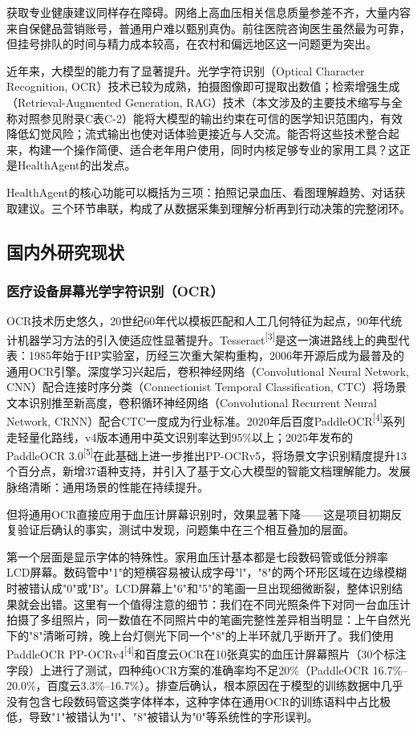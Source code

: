 \documentclass[zihao=-4,a4paper]{ctexart}
\numberwithin{figure}{section}
\numberwithin{table}{section}
\begin{document}
获取专业健康建议同样存在障碍。网络上高血压相关信息质量参差不齐，大量内容来自保健品营销账号，普通用户难以甄别真伪。前往医院咨询医生虽然最为可靠，但挂号排队的时间与精力成本较高，在农村和偏远地区这一问题更为突出。

近年来，大模型的能力有了显著提升。光学字符识别（Optical Character Recognition, OCR）技术已较为成熟，拍摄图像即可提取出数值；检索增强生成（Retrieval-Augmented Generation, RAG）技术（本文涉及的主要技术缩写与全称对照参见附录C表C-2）能将大模型的输出约束在可信的医学知识范围内，有效降低幻觉风险；流式输出也使对话体验更接近与人交流。能否将这些技术整合起来，构建一个操作简便、适合老年用户使用，同时内核足够专业的家用工具？这正是HealthAgent的出发点。

HealthAgent的核心功能可以概括为三项：拍照记录血压、看图理解趋势、对话获取建议。三个环节串联，构成了从数据采集到理解分析再到行动决策的完整闭环。

\subsection{国内外研究现状}

\subsubsection{医疗设备屏幕光学字符识别（OCR）}

OCR技术历史悠久，20世纪60年代以模板匹配和人工几何特征为起点，90年代统计机器学习方法的引入使适应性显著提升。Tesseract\textsuperscript{[3]}是这一演进路线上的典型代表：1985年始于HP实验室，历经三次重大架构重构，2006年开源后成为最普及的通用OCR引擎。深度学习兴起后，卷积神经网络（Convolutional Neural Network, CNN）配合连接时序分类（Connectionist Temporal Classification, CTC）将场景文本识别推至新高度，卷积循环神经网络（Convolutional Recurrent Neural Network, CRNN）配合CTC一度成为行业标准。2020年后百度PaddleOCR\textsuperscript{[4]}系列走轻量化路线，v4版本通用中英文识别率达到95\%以上；2025年发布的PaddleOCR 3.0\textsuperscript{[5]}在此基础上进一步推出PP-OCRv5，将场景文字识别精度提升13个百分点，新增37语种支持，并引入了基于文心大模型的智能文档理解能力。发展脉络清晰：通用场景的性能在持续提升。

但将通用OCR直接应用于血压计屏幕识别时，效果显著下降——这是项目初期反复验证后确认的事实，测试中发现，问题集中在三个相互叠加的层面。

第一个层面是显示字体的特殊性。家用血压计基本都是七段数码管或低分辨率LCD屏幕。数码管中"1"的短横容易被认成字母"l"，"8"的两个环形区域在边缘模糊时被错认成"0"或"B"。LCD屏幕上"6"和"5"的笔画一旦出现细微断裂，整体识别结果就会出错。这里有一个值得注意的细节：我们在不同光照条件下对同一台血压计拍摄了多组照片，同一数值在不同照片中的笔画完整性差异相当明显：上午自然光下的"8"清晰可辨，晚上台灯侧光下同一个"8"的上半环就几乎断开了。我们使用PaddleOCR PP-OCRv4\textsuperscript{[4]}和百度云OCR在10张真实的血压计屏幕照片（30个标注字段）上进行了测试，四种纯OCR方案的准确率均不足20\%（PaddleOCR 16.7\%--20.0\%，百度云3.3\%--16.7\%）。排查后确认，根本原因在于模型的训练数据中几乎没有包含七段数码管这类字体样本，这种字体在通用OCR的训练语料中占比极低，导致"1"被错认为"l"、"8"被错认为"0"等系统性的字形误判。
\end{document}
